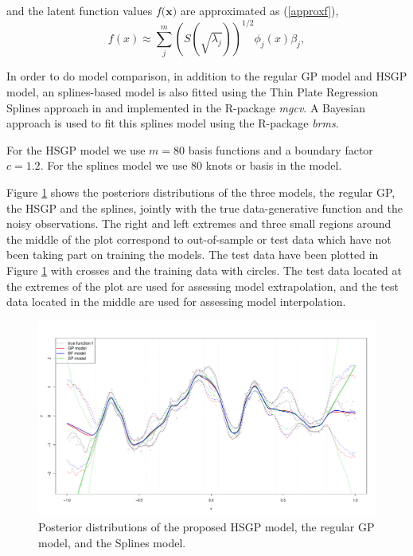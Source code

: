 \documentclass[]{interact}
\theoremstyle{plain}%
\theoremstyle{definition}
\theoremstyle{remark}
\begin{document}
\noindent and the latent function values $f(\mathbf{x)}$ are approximated as (\ref{approxf}),
%
\begin{equation*}
f(x) \approx \sum_{j}^m \left( S(\sqrt{\lambda_j})\right)^{1/2} \phi_j(x) \beta_j, \nonumber
\end{equation*}

In order to do model comparison, in addition to the regular GP model and HSGP model, an splines-based model is also fitted using the Thin Plate Regression Splines approach in \cite{wood2003thin} and implemented in the R-package \textit{mgcv}. A Bayesian approach is used to fit this splines model using the R-package \textit{brms}.

For the HSGP model we use $m=80$ basis functions and a boundary factor $c=1.2$. For the splines model we use 80 knots or basis in the model.

Figure \ref{fig10_Posteriors_exI} shows the posteriors distributions of the three models, the regular GP, the HSGP and the splines, jointly with the true data-generative function and the noisy observations. The right and left extremes and three small regions around the middle of the plot correspond to out-of-sample or test data which have not been taking part on training the models. The test data have been plotted in Figure \ref{fig10_Posteriors_exI} with crosses and the training data with circles. The test data located at the extremes of the plot are used for assessing model extrapolation, and the test data located in the middle are used for assessing model interpolation.

\begin{figure}[H]
\centering
\includegraphics[scale=0.35]{fig10_Posteriors_exI.pdf}
\caption{Posterior distributions of the proposed HSGP model, the regular GP model, and the Splines model.}
  \label{fig10_Posteriors_exI}
\end{figure}
\end{document}
